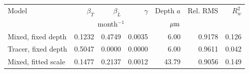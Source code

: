 \begin{tabular}{lrrrrrr}\toprule
Model & $\beta_T$ & $\beta_L$ & $\gamma$ & Depth $a$ & Rel. RMS & $R_w^2$\\
 & \multicolumn{3}{c}{month$^{-1}$} & $\,\mu\mathrm{m}$ & &\\\midrule
Mixed, fixed depth & 0.1232 & 0.4749 & 0.0035 & 6.00 & 0.9178 & 0.126 \\
Tracer, fixed depth & 0.5047 & 0.0000 & 0.0000 & 6.00 & 0.9611 & 0.042 \\
Mixed, fitted scale & 0.1477 & 0.2137 & 0.0012 & 43.79 & 0.9056 & 0.149 \\
\bottomrule\end{tabular}
